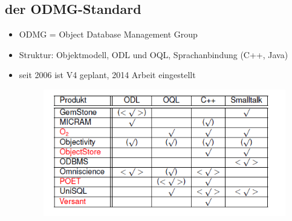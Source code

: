 \subsection{der ODMG-Standard}
\begin{itemize}
	\item ODMG = Object Database Management Group
	\item Struktur: Objektmodell, ODL und OQL, Sprachanbindung (C++, Java) 
	\item seit 2006 ist V4 geplant, 2014 Arbeit eingestellt
	\begin{figure}[!h]
		\centering
		\includegraphics[scale=0.6]{img/odmg_konformitaet_1997.png}
	\end{figure}
	

\end{itemize}
